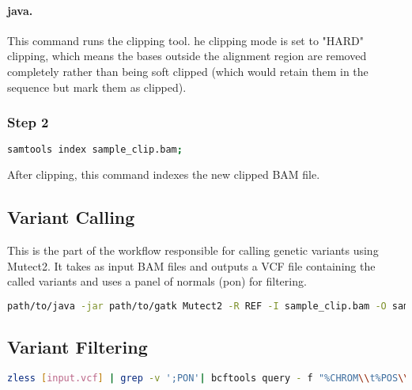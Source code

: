 \paragraph*{java.} This command runs the clipping tool. he clipping mode is set to "HARD" clipping, which means the bases outside the alignment region are removed completely rather than being soft clipped (which would retain them in the sequence but mark them as clipped).

\subsubsection*{Step 2}

\begin{lstlisting}[breaklines=true, language=bash]
    samtools index sample_clip.bam;
\end{lstlisting}

After clipping, this command indexes the new clipped BAM file.

\subsection{Variant Calling}
This is the part of the workflow responsible for calling genetic variants using Mutect2. It takes as input BAM files and outputs a VCF file containing the called variants and uses a panel of normals (pon) for filtering.

\begin{lstlisting}[breaklines=true, language=bash]
    path/to/java -jar path/to/gatk Mutect2 -R REF -I sample_clip.bam -O sample.vcf.gz --panel-of-normals pon.vcf.gz --native-pair-hmm-threads 12
\end{lstlisting}

\subsection{Variant Filtering}

\begin{lstlisting}[breaklines=true, language=bash]
    zless [input.vcf] | grep -v ';PON'| bcftools query - f "%CHROM\\t%POS\\t[%AD\\t%DP\\n]" | sed 's!,!\\t!' | awk '$5>=20 && $4>=5 {{print $1"\\t"$2}}' | gzip > sample_filtered.vcf.gz
\end{lstlisting}

